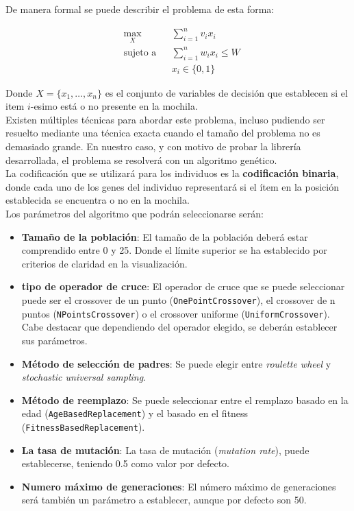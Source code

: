 De manera formal se puede describir el problema de esta forma:

\begin{equation*}
\begin{aligned}
& \underset{X}{\text{max}}
& & \sum_{i=1}^n v_i x_i \\
& \text{sujeto a}
& & \sum_{i=1}^n w_i x_i \leq W \\
&&& x_i \in \{0, 1\}
\end{aligned}
\end{equation*}

Donde $X = \{x_1, \dots, x_n\}$ es el conjunto de variables de decisión que establecen si el item $i$-esimo está o no presente en la mochila. \\

Existen múltiples técnicas para abordar este problema, incluso pudiendo ser resuelto mediante una técnica exacta cuando el tamaño del problema no es demasiado grande. En nuestro caso, y con motivo de probar la librería desarrollada, el problema se resolverá con un algoritmo genético. \\

La codificación que se utilizará para los individuos es la \textbf{codificación binaria}, donde cada uno de los genes del individuo representará si el ítem en la posición establecida se encuentra o no en la mochila. \\

Los parámetros del algoritmo que podrán seleccionarse serán:

\begin{itemize}
    \item \textbf{Tamaño de la población}: El tamaño de la población deberá estar comprendido entre 0 y 25. Donde el límite superior se ha establecido por criterios de claridad en la visualización.
    \item \textbf{tipo de operador de cruce}: El operador de cruce que se puede seleccionar puede ser el crossover de un punto (\texttt{OnePointCrossover}), el crossover de n puntos (\texttt{NPointsCrossover}) o el crossover uniforme (\texttt{UniformCrossover}). Cabe destacar que dependiendo del operador elegido, se deberán establecer sus parámetros.
    \item \textbf{Método de selección de padres}: Se puede elegir entre \textit{roulette wheel} y \textit{stochastic universal sampling}.
    \item \textbf{Método de reemplazo}: Se puede seleccionar entre el remplazo basado en la edad (\texttt{AgeBasedReplacement}) y el basado en el fitness (\texttt{FitnessBasedReplacement}).
    \item \textbf{La tasa de mutación}: La tasa de mutación (\textit{mutation rate}), puede establecerse, teniendo 0.5 como valor por defecto.
    \item \textbf{Numero máximo de generaciones}: El número máximo de generaciones será también un parámetro a establecer, aunque por defecto son 50.
\end{itemize}

